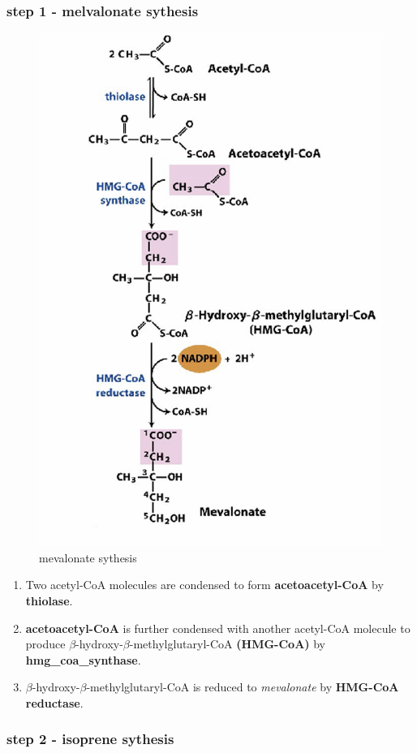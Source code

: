 \documentclass[../main.tex]{subfiles}
\begin{document}
\subsubsection{step 1 - melvalonate sythesis}
\begin{figure}[H]
    \centering
    \includegraphics[width=0.5\linewidth]{melvalonateSythesis.png}
    \caption{\gls{mevalonate} sythesis}
    \label{fig:enter-label}
\end{figure}
\begin{enumerate}
    \item Two acetyl-CoA molecules are condensed to form \textbf{acetoacetyl-CoA} by \textbf{\gls{thiolase}}.
    
    \item \textbf{\gls{acetoacetyl}-CoA} is further condensed with another acetyl-CoA molecule to produce $\beta$-hydroxy-$\beta$-methylglutaryl-CoA \textbf{(HMG-CoA)} by \textbf{\gls{hmg_coa_synthase}}.
    
    \item $\beta$-hydroxy-$\beta$-methylglutaryl-CoA is reduced to \textit{mevalonate} by \textbf{HMG-CoA reductase}.
\end{enumerate}


\subsubsection{step 2 - isoprene sythesis}
\end{document}
